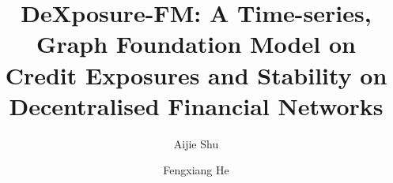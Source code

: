 \documentclass[preprint,12pt]{elsarticle}
\begin{document}
\begin{frontmatter}



\title{DeXposure-FM: A Time-series, Graph Foundation Model on Credit Exposures and Stability on Decentralised Financial Networks}

\author[label1]{Aijie Shu}
\author[label3,label1]{Fengxiang He}







\end{frontmatter}
\end{document}
